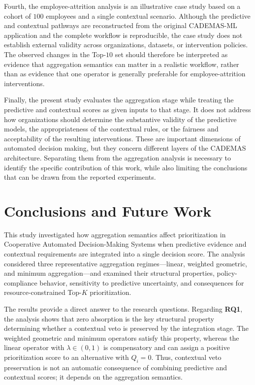 \documentclass[mathematics,article,submit,moreauthors]{Definitions/mdpi}
\begin{document}
Fourth, the employee-attrition analysis is an illustrative case study based
on a cohort of $100$ employees and a single contextual scenario. Although
the predictive and contextual pathways are reconstructed from the original
CADEMAS-ML application and the complete workflow is reproducible, the case
study does not establish external validity across organizations, datasets,
or intervention policies. The observed changes in the Top-$10$ set should
therefore be interpreted as evidence that aggregation semantics can matter
in a realistic workflow, rather than as evidence that one operator is
generally preferable for employee-attrition interventions.

Finally, the present study evaluates the aggregation stage while treating
the predictive and contextual scores as given inputs to that stage. It does
not address how organizations should determine the substantive validity of
the predictive models, the appropriateness of the contextual rules, or the
fairness and acceptability of the resulting interventions. These are
important dimensions of automated decision making, but they concern
different layers of the CADEMAS architecture. Separating them from the
aggregation analysis is necessary to identify the specific contribution of
this work, while also limiting the conclusions that can be drawn from the
reported experiments.

\section{Conclusions and Future Work}
\label{sec:conclusions-future-work}

This study investigated how aggregation semantics affect prioritization in
Cooperative Automated Decision-Making Systems when predictive evidence and
contextual requirements are integrated into a single decision score. The
analysis considered three representative aggregation regimes---linear,
weighted geometric, and minimum aggregation---and examined their structural
properties, policy-compliance behavior, sensitivity to predictive
uncertainty, and consequences for resource-constrained Top-$K$
prioritization.

The results provide a direct answer to the research questions. Regarding
\textbf{RQ1}, the analysis shows that zero absorption is the key structural
property determining whether a contextual veto is preserved by the
integration stage. The weighted geometric and minimum operators satisfy this
property, whereas the linear operator with $\lambda\in(0,1)$ is
compensatory and can assign a positive prioritization score to an
alternative with $Q_i=0$. Thus, contextual veto preservation is not an
automatic consequence of combining predictive and contextual scores; it
depends on the aggregation semantics.
\end{document}
